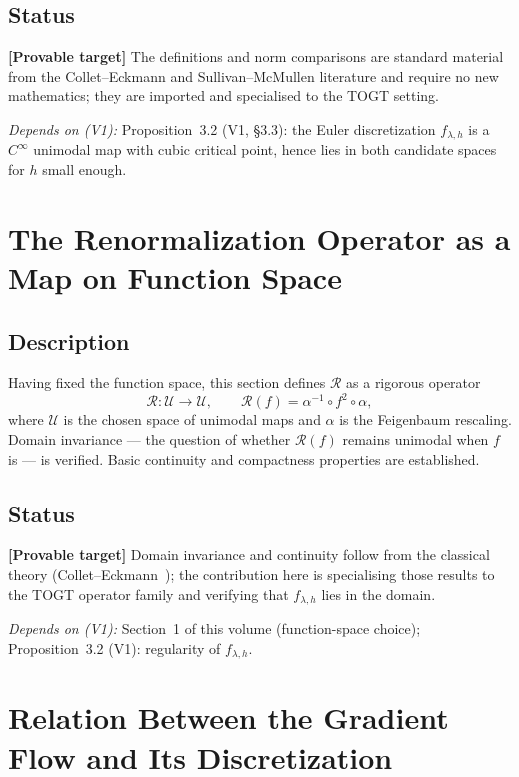 \documentclass[11pt]{article}
\newcommand{\provable}{\textcolor{blue!70!black}{\textbf{[Provable target]}}}
\newcommand{\depends}[1]{\smallskip\noindent\textit{Depends on (V1):} #1.\smallskip}
\begin{document}
\subsection*{Status}
\provable{} The definitions and norm comparisons are standard material from
the Collet--Eckmann and Sullivan--McMullen literature and require no new
mathematics; they are imported and specialised to the TOGT setting.

\depends{Proposition~3.2 (V1, \S3.3): the Euler discretization
$f_{\lambda,h}$ is a $C^\infty$ unimodal map with cubic critical point,
hence lies in both candidate spaces for $h$ small enough}

\section{The Renormalization Operator as a Map on Function Space}

\subsection*{Description}
Having fixed the function space, this section defines $\mathcal{R}$ as a
rigorous operator
\[
  \mathcal{R} : \mathcal{U} \to \mathcal{U},
  \qquad
  \mathcal{R}(f) = \alpha^{-1} \circ f^2 \circ \alpha,
\]
where $\mathcal{U}$ is the chosen space of unimodal maps and $\alpha$ is
the Feigenbaum rescaling. Domain invariance --- the question of whether
$\mathcal{R}(f)$ remains unimodal when $f$ is --- is verified. Basic
continuity and compactness properties are established.

\subsection*{Status}
\provable{} Domain invariance and continuity follow from the classical theory
(Collet--Eckmann~\cite{collet1980}); the contribution here is specialising
those results to the TOGT operator family and verifying that
$f_{\lambda,h}$ lies in the domain.

\depends{Section~1 of this volume (function-space choice);
Proposition~3.2 (V1): regularity of $f_{\lambda,h}$}

\section{Relation Between the Gradient Flow and Its Discretization}
\end{document}

